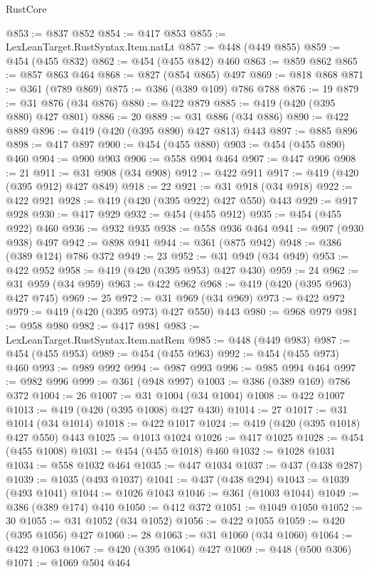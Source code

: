 \begin{lexlean}{RustCore}
\begin{coremodule}
@853 := @837 @852
@854 := @417 @853
@855 := LexLeanTarget.RustSyntax.Item.natLt
@857 := @448 (@449 @855)
@859 := @454 (@455 @832)
@862 := @454 (@455 @842) @460
@863 := @859 @862
@865 := @857 @863 @464
@868 := @827 (@854 @865) @497
@869 := @818 @868
@871 := @361 (@789 @869)
@875 := @386 (@389 @109) @786 @788
@876 := 19
@879 := @31 @876 (@34 @876)
@880 := @422 @879
@885 := @419 (@420 (@395 @880) @427 @801)
@886 := 20
@889 := @31 @886 (@34 @886)
@890 := @422 @889
@896 := @419 (@420 (@395 @890) @427 @813) @443
@897 := @885 @896
@898 := @417 @897
@900 := @454 (@455 @880)
@903 := @454 (@455 @890) @460
@904 := @900 @903
@906 := @558 @904 @464
@907 := @447 @906
@908 := 21
@911 := @31 @908 (@34 @908)
@912 := @422 @911
@917 := @419 (@420 (@395 @912) @427 @849)
@918 := 22
@921 := @31 @918 (@34 @918)
@922 := @422 @921
@928 := @419 (@420 (@395 @922) @427 @550) @443
@929 := @917 @928
@930 := @417 @929
@932 := @454 (@455 @912)
@935 := @454 (@455 @922) @460
@936 := @932 @935
@938 := @558 @936 @464
@941 := @907 (@930 @938) @497
@942 := @898 @941
@944 := @361 (@875 @942)
@948 := @386 (@389 @124) @786 @372
@949 := 23
@952 := @31 @949 (@34 @949)
@953 := @422 @952
@958 := @419 (@420 (@395 @953) @427 @430)
@959 := 24
@962 := @31 @959 (@34 @959)
@963 := @422 @962
@968 := @419 (@420 (@395 @963) @427 @745)
@969 := 25
@972 := @31 @969 (@34 @969)
@973 := @422 @972
@979 := @419 (@420 (@395 @973) @427 @550) @443
@980 := @968 @979
@981 := @958 @980
@982 := @417 @981
@983 := LexLeanTarget.RustSyntax.Item.natRem
@985 := @448 (@449 @983)
@987 := @454 (@455 @953)
@989 := @454 (@455 @963)
@992 := @454 (@455 @973) @460
@993 := @989 @992
@994 := @987 @993
@996 := @985 @994 @464
@997 := @982 @996
@999 := @361 (@948 @997)
@1003 := @386 (@389 @169) @786 @372
@1004 := 26
@1007 := @31 @1004 (@34 @1004)
@1008 := @422 @1007
@1013 := @419 (@420 (@395 @1008) @427 @430)
@1014 := 27
@1017 := @31 @1014 (@34 @1014)
@1018 := @422 @1017
@1024 := @419 (@420 (@395 @1018) @427 @550) @443
@1025 := @1013 @1024
@1026 := @417 @1025
@1028 := @454 (@455 @1008)
@1031 := @454 (@455 @1018) @460
@1032 := @1028 @1031
@1034 := @558 @1032 @464
@1035 := @447 @1034
@1037 := @437 (@438 @287)
@1039 := @1035 (@493 @1037)
@1041 := @437 (@438 @294)
@1043 := @1039 (@493 @1041)
@1044 := @1026 @1043
@1046 := @361 (@1003 @1044)
@1049 := @386 (@389 @174) @410
@1050 := @412 @372
@1051 := @1049 @1050
@1052 := 30
@1055 := @31 @1052 (@34 @1052)
@1056 := @422 @1055
@1059 := @420 (@395 @1056) @427
@1060 := 28
@1063 := @31 @1060 (@34 @1060)
@1064 := @422 @1063
@1067 := @420 (@395 @1064) @427
@1069 := @448 (@500 @306)
@1071 := @1069 @504 @464

\end{coremodule}
\end{lexlean}
